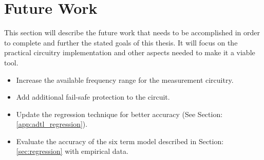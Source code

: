 \section {Future Work}
\label{sec:futureWork}

This section will describe the future work that needs to be accomplished in order to complete and further the stated goals of this thesis. It will focus on the practical circuitry implementation and other aspects needed to make it a viable tool.

\begin{itemize}
    \item Increase the available frequency range for the measurement circuitry.
    \item Add additional fail-safe protection to the circuit.
    \item Update the regression technique for better accuracy (See Section: \ref{app:adtl_regression}).
    \item Evaluate the accuracy of the six term model described in Section: \ref{sec:regression} with empirical data.
\end{itemize}

